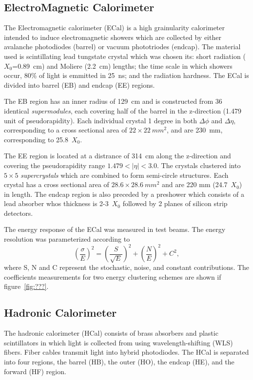 \subsection{ElectroMagnetic Calorimeter}
\label{sec:ECal}

The Electromagnetic calorimeter (ECal) is a high grainularity calorimeter
intended to induce electromagnetic showers which are collected by either
avalanche photodiodes (barrel) or vacuum phototriodes (endcap).  The 
material used is scintillating lead tungstate crystal
which was chosen its: short radiation ($X_0$=0.89~cm) and Moliere (2.2~cm) 
lengths; the time scale in which showers occur, 80\% of light is emmitted
in 25~ns; and the radiation hardness.  The ECal is divided into barrel (EB)
and endcap (EE) regions.

The EB region has an inner radius of 129~cm and is constructed from 36
identical {\it supermodules}, each covering half of the barrel in the 
z-direction (1.479 unit of pseudorapidity).  Each individual crystal 
1 degree in both $\Delta\phi$ and $\Delta\eta$, corresponding to a cross
sectional area of $22\times22~mm^2$, and are 230~mm, corresponding to 
25.8~$X_0$.

The EE region is located at a distrance of 314~cm along the z-direction
and covering the pseudorapidity range $1.479<|\eta|<3.0$.  The crystals
clustered into $5\times5$ {\it supercrystals} which are combined to form
semi-circle structures.  Each crystal has a cross sectional area of 
$28.6\times28.6~mm^2$ and are 220 mm (24.7~$X_0$) in length.  The endcap 
region is also preceded by a preshower which consists of a lead absorber
whos thickness is 2-3~$X_0$ followed by 2 planes of silicon strip detectors.

The energy response of the ECal was measured in test beams.  The energy 
resolution was parameterized according to
\begin{equation}
\left(\frac{\sigma}{E}\right)^2 = \left(\frac{S}{\sqrt{E}}\right)^2 + \left(\frac{N}{E}\right)^2 + C^2,
\end{equation}
where S, N and C represent the stochastic, noise, and constant contributions.
The coefficients measurements for two energy clustering schemes are shown
if figure~\ref{fig:???}.

\subsection{Hadronic Calorimeter}
\label{sec:HCal}

The hadronic calorimeter (HCal) consists of brass absorbers and plastic 
scintillators
in which light is collected from using wavelength-shifting (WLS) fibers. 
Fiber cables transmit light into hybrid photodiodes.  The HCal is separated
into four regions, the barrel (HB), the outer (HO), the endcap (HE), 
and the forward (HF) region.

